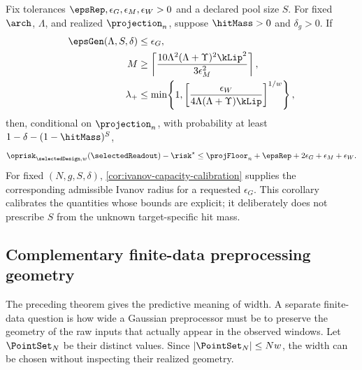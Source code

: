\begin{corollary}
\label{cor:resource-budget-calibration}
Fix tolerances $\epsRep,\epsilon_G,\epsilon_M,\epsilon_W>0$ and a declared
pool size $S$.  For fixed $\arch$, $\Lambda$, and realized $\projection_n$,
suppose $\hitMass>0$ and $\delta_g>0$.  If
\begin{equation}
\begin{aligned}
    \epsGen(\Lambda,S,\delta)&\leq\epsilon_G,\\
    M&\geq
    \left\lceil
      \frac{10\Lambda^2(\Lambda+\Upsilon)^2\kLip^2}{3\epsilon_M^2}
    \right\rceil,\\
    \lambda_+&\leq
    \min\!\left\{1,
      \left[\frac{\epsilon_W}
      {4\Lambda(\Lambda+\Upsilon)\kLip}\right]^{1/w}
    \right\},
\end{aligned}
    \label{eq:resource-budget-conditions}
\end{equation}
then, conditional on $\projection_n$, with probability at least
$1-\delta-(1-\hitMass)^S$,
\begin{equation}
    \oprisk_{\selectedDesign,w}(\selectedReadout)-\risk^\star
    \leq
    \projFloor_n+\epsRep+2\epsilon_G+\epsilon_M+\epsilon_W.
    \label{eq:calibrated-resource-performance}
\end{equation}
For fixed $(N,g,S,\delta)$, \cref{cor:ivanov-capacity-calibration} supplies the
corresponding admissible Ivanov radius for a requested $\epsilon_G$.  This
corollary calibrates the quantities whose bounds are explicit; it deliberately
does not prescribe $S$ from the unknown target-specific hit mass.
\end{corollary}

\subsection{Complementary finite-data preprocessing geometry}
\label{sec:finite-data-geometry}

The preceding theorem gives the predictive meaning of width.  A separate
finite-data question is how wide a Gaussian preprocessor must be to preserve
the geometry of the raw inputs that actually appear in the observed windows.
Let $\PointSet_N$ be their distinct values.  Since
$|\PointSet_N|\leq Nw$, the width can be chosen without inspecting their
realized geometry.

